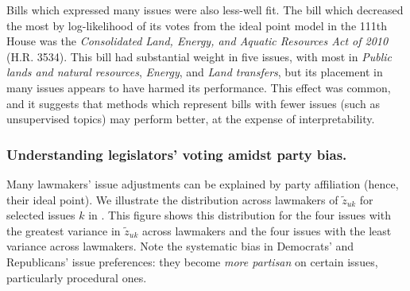 Bills which expressed many issues were also less-well fit.  The bill
which decreased the most by log-likelihood of its votes from the ideal
point model in the 111th House was the \emph{Consolidated Land,
  Energy, and Aquatic Resources Act of 2010} (H.R. 3534).  This bill
had substantial weight in five issues, with most in \emph{Public lands
  and natural resources}, \emph{Energy}, and \emph{Land transfers},
but its placement in many issues appears to have harmed its
performance.  This effect was common, and it suggests that methods
which represent bills with fewer issues (such as unsupervised topics)
may perform better, at the expense of interpretability.

\subsubsection{Understanding legislators' voting amidst party bias.}
\label{section:party_bias}
Many lawmakers' issue adjustments can be explained by party
affiliation (hence, their ideal point).  We illustrate the
distribution across lawmakers of $\tilde z_{uk}$ for selected issues
$k$ in .  This figure shows this
distribution for the four issues with the greatest variance in $\tilde
z_{uk}$ across lawmakers and the four issues with the least variance
across lawmakers. Note the systematic bias in Democrats' and
Republicans' issue preferences: they become \emph{more partisan} on
certain issues, particularly procedural ones.

